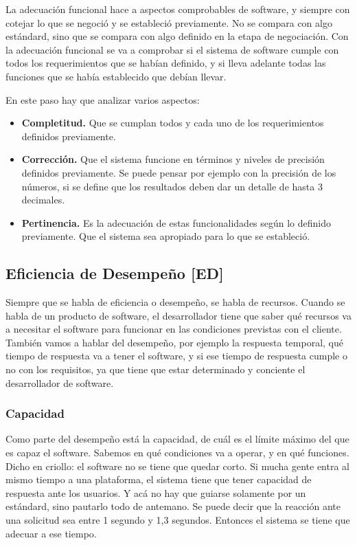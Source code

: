La adecuación funcional hace a aspectos comprobables de software, y
siempre con cotejar lo que se negoció y se estableció previamente. No se
compara con algo estándard, sino que se compara con algo definido en la
etapa de negociación. Con la adecuación funcional se va a comprobar si
el sistema de software cumple con todos los requerimientos que se habían
definido, y si lleva adelante todas las funciones que se había
establecido que debían llevar.

En este paso hay que analizar varios aspectos:

\begin{itemize}

\item
  \textbf{Completitud.} Que se cumplan todos y cada uno de los
  requerimientos definidos previamente.
\item
  \textbf{Corrección.} Que el sistema funcione en términos y niveles de
  precisión definidos previamente. Se puede pensar por ejemplo con la
  precisión de los números, si se define que los resultados deben dar un
  detalle de hasta 3 decimales.
\item
  \textbf{Pertinencia.} Es la adecuación de estas funcionalidades según
  lo definido previamente. Que el sistema sea apropiado para lo que se
  estableció.
\end{itemize}

\hypertarget{eficiencia-de-desempeuxf1o-ed}{%
\subsection{Eficiencia de Desempeño
{[}ED{]}}\label{eficiencia-de-desempeuxf1o-ed}}

Siempre que se habla de eficiencia o desempeño, se habla de recursos.
Cuando se habla de un producto de software, el desarrollador tiene que
saber qué recursos va a necesitar el software para funcionar en las
condiciones previstas con el cliente. También vamos a hablar del
desempeño, por ejemplo la respuesta temporal, qué tiempo de respuesta va
a tener el software, y si ese tiempo de respuesta cumple o no con los
requisitos, ya que tiene que estar determinado y conciente el
desarrollador de software.

\hypertarget{capacidad}{%
\subsubsection{Capacidad}\label{capacidad}}

Como parte del desempeño está la capacidad, de cuál es el límite máximo
del que es capaz el software. Sabemos en qué condiciones va a operar, y
en qué funciones. Dicho en criollo: el software no se tiene que quedar
corto. Si mucha gente entra al mismo tiempo a una plataforma, el sistema
tiene que tener capacidad de respuesta ante los usuarios. Y acá no hay
que guiarse solamente por un estándard, sino pautarlo todo de antemano.
Se puede decir que la reacción ante una solicitud sea entre 1 segundo y
1,3 segundos. Entonces el sistema se tiene que adecuar a ese tiempo.

